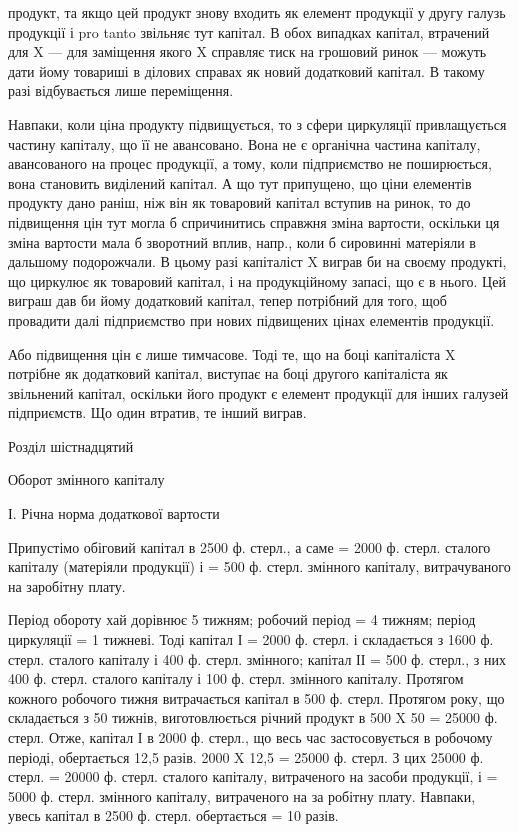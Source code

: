 \parcont{}  %
продукт, та якщо цей продукт знову входить як елемент продукції у
другу галузь продукції і pro tanto звільняє тут капітал. В обох випадках
капітал, втрачений для X — для заміщення якого X справляє тиск на грошовий
ринок — можуть дати йому товариші в ділових справах як новий
додатковий капітал. В такому разі відбувається лише переміщення.

Навпаки, коли ціна продукту підвищується, то з сфери циркуляції
привлащується частину капіталу, що її не авансовано. Вона не є
органічна частина капіталу, авансованого на процес продукції, а тому,
коли підприємство не поширюється, вона становить виділений капітал.
А що тут припущено, що ціни елементів продукту дано раніш, ніж він
як товаровий капітал вступив на ринок, то до підвищення цін тут могла б
спричинитись справжня зміна вартости, оскільки ця зміна вартости мала б
зворотний вплив, напр., коли б сировинні матеріяли в дальшому
подорожчали. В цьому разі капіталіст X виграв би на своєму продукті,
що циркулює як товаровий капітал, і на продукційному запасі, що є в
нього. Цей виграш дав би йому додатковий капітал, тепер потрібний для
того, щоб провадити далі підприємство при нових підвищених цінах елементів
продукції.

Або підвищення цін є лише тимчасове. Тоді те, що на боці капіталіста
X потрібне як додатковий капітал, виступає на боці другого капіталіста
як звільнений капітал, оскільки його продукт є елемент продукції
для інших галузей підприємств. Що один втратив, те інший виграв.

Розділ шістнадцятий

Оборот змінного капіталу

І. Річна норма додаткової вартости

Припустімо обіговий капітал в 2500 ф. стерл., а саме  = 2000 ф.
стерл. сталого капіталу (матеріяли продукції) і  = 500 ф. стерл. змінного
капіталу, витрачуваного на заробітну плату.

Період обороту хай дорівнює 5 тижням; робочий період = 4 тижням;
період циркуляції = 1 тижневі. Тоді капітал І = 2000 ф. стерл. і складається
з 1600 ф. стерл. сталого капіталу і 400 ф. стерл. змінного; капітал
ІІ = 500 ф. стерл., з них 400 ф. стерл. сталого капіталу і 100 ф.
стерл. змінного капіталу. Протягом кожного робочого тижня витрачається
капітал в 500 ф. стерл. Протягом року, що складається з 50 тижнів,
виготовлюється річний продукт в 500 X 50 = 25000 ф. стерл. Отже, капітал
І в 2000 ф. стерл., що весь час застосовується в робочому періоді,
обертається 12,5 разів. 2000 X 12,5 = 25000 ф. стерл. З цих 25000 ф.
стерл.  = 20000 ф. стерл. сталого капіталу, витраченого на засоби
продукції, і  = 5000 ф. стерл. змінного капіталу, витраченого на за
робітну плату. Навпаки, увесь капітал в 2500 ф. стерл. обертається
 = 10 разів.

